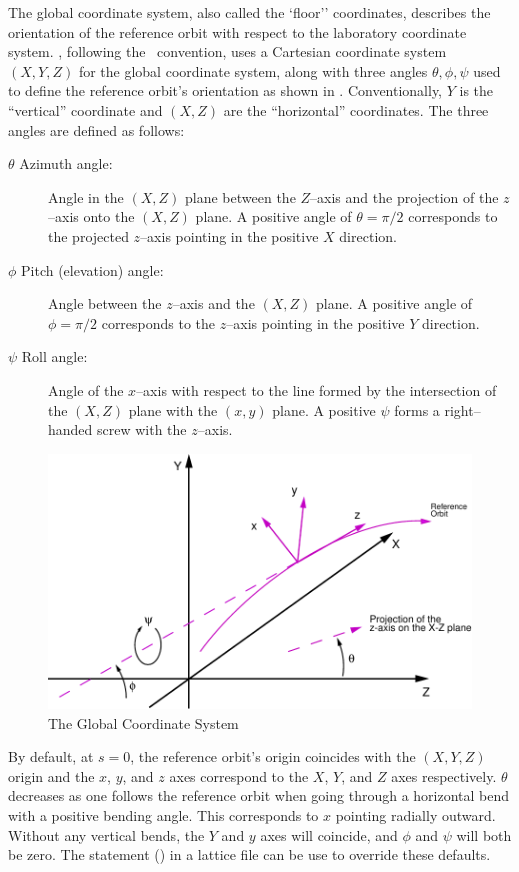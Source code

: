 The global coordinate system, also called the `floor'' coordinates,
describes the orientation of the reference
orbit with respect to the laboratory coordinate system.  \bmad,
following the \mad\ convention, uses a Cartesian coordinate system
$(X, Y, Z)$ for the global coordinate system, along with three angles
$\theta, \phi, \psi$ used to define the reference orbit's orientation
as shown in . Conventionally, $Y$ is the
``vertical'' coordinate and $(X, Z)$ are the ``horizontal'' coordinates.  
The three angles are defined as follows:
\begin{description}
\item[$\theta$ Azimuth angle:] Angle in the $(X, Z)$ plane 
between the $Z$--axis and the projection of the $z$--axis onto the
$(X, Z)$ plane. A positive angle of $\theta = \pi/2$ corresponds to the
projected $z$--axis pointing in the positive $X$ direction.
\item[$\phi$ Pitch (elevation) angle:] Angle between the $z$--axis 
and the $(X,Z)$ plane. A positive angle of $\phi = \pi/2$ corresponds to
the $z$--axis pointing in the positive $Y$ direction.
\item[$\psi$ Roll angle:] Angle of the $x$--axis with respect 
to the line formed by the
intersection of the $(X, Z)$ plane with the $(x, y)$ plane. A
positive $\psi$ forms a right--handed screw with the $z$--axis.
\end{description}

\begin{figure}
\centering
\includegraphics{global-coords.pdf}
\caption{The Global Coordinate System}
\label{f:global.coords}
\end{figure}

By default, at $s = 0$, the reference orbit's origin coincides with
the $(X, Y, Z)$ origin and the $x$, $y$, and $z$ axes correspond to
the $X$, $Y$, and $Z$ axes respectively. $\theta$ decreases as one
follows the reference orbit when going through a horizontal bend with
a positive bending angle. This corresponds to $x$ pointing radially
outward. Without any vertical bends, the $Y$ and $y$ axes will
coincide, and $\phi$ and $\psi$ will both be zero. The 
statement () in a lattice file can be use to
override these defaults.

